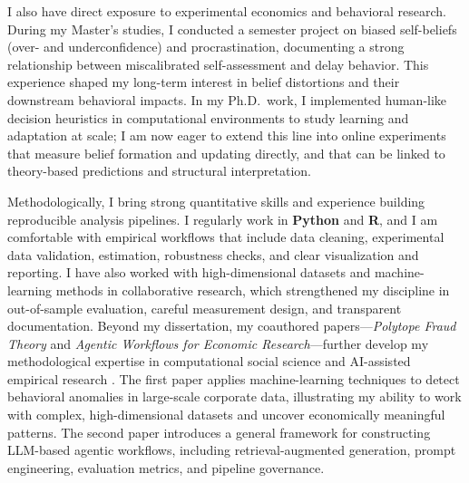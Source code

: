 \documentclass[11pt]{article}
\begin{document}
I also have direct exposure to experimental economics and behavioral research. During my Master's studies, I conducted a semester project on biased self-beliefs (over- and underconfidence) and procrastination, documenting a strong relationship between miscalibrated self-assessment and delay behavior. This experience shaped my long-term interest in belief distortions and their downstream behavioral impacts. In my Ph.D.\ work, I implemented human-like decision heuristics in computational environments to study learning and adaptation at scale; I am now eager to extend this line into online experiments that measure belief formation and updating directly, and that can be linked to theory-based predictions and structural interpretation.

Methodologically, I bring strong quantitative skills and experience building reproducible analysis pipelines. I regularly work in \textbf{Python} and \textbf{R}, and I am comfortable with empirical workflows that include data cleaning, experimental data validation, estimation, robustness checks, and clear visualization and reporting. I have also worked with high-dimensional datasets and machine-learning methods in collaborative research, which strengthened my discipline in out-of-sample evaluation, careful measurement design, and transparent documentation. 
Beyond my dissertation, my coauthored papers—\textit{Polytope Fraud Theory} and \textit{Agentic Workflows for Economic Research}—further develop my methodological expertise in computational social science and AI-assisted empirical research \citep{Zhao2025, Dawid2025}. 
The first paper applies machine-learning techniques to detect behavioral anomalies in large-scale corporate data, illustrating my ability to work with complex, high-dimensional datasets and uncover economically meaningful patterns. 
The second paper introduces a general framework for constructing LLM-based agentic workflows, including retrieval-augmented generation, prompt engineering, evaluation metrics, and pipeline governance. 
\end{document}
